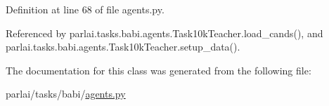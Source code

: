 Definition at line 68 of file agents.\+py.



Referenced by parlai.\+tasks.\+babi.\+agents.\+Task10k\+Teacher.\+load\+\_\+cands(), and parlai.\+tasks.\+babi.\+agents.\+Task10k\+Teacher.\+setup\+\_\+data().



The documentation for this class was generated from the following file\+:\begin{DoxyCompactItemize}
\item 
parlai/tasks/babi/\hyperlink{parlai_2tasks_2babi_2agents_8py}{agents.\+py}\end{DoxyCompactItemize}
